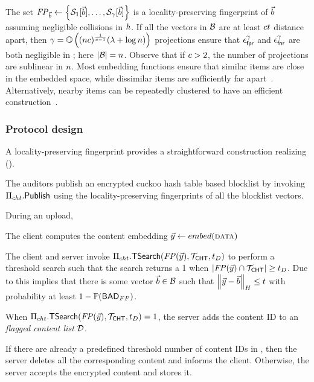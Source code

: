The set $\fingerprint{\blocklistVec} \assign \setDefn{\projBuckets[1][\blocklistVec], \dots, \projBuckets[\numProjections][\blocklistVec]}$ is a locality-preserving 
fingerprint of $\blocklistVec$ assuming negligible collisions in $\hashFn$. If all the vectors in $\blocklist$ are at least $c 
t$ distance apart, then $\gamma = \mathbb{O}\left((n 
c)^{\frac{1}{c - 1}} (\lambda + \log n)\right)$ projections ensure that 
$\epsilon_\mathsf{fpr}^\gamma$ and $\epsilon_\mathsf{fnr}^\gamma$ are both negligible in \secParam; here $\setSize{\blocklist} = \blocklistSize$. Observe that if $c > 2$, the number of projections are sublinear in 
$n$. Most embedding functions ensure that similar 
items are close in the embedded space, while dissimilar items are sufficiently far apart~\cite{kulshrestha2021identifying, mckeown2023hamming}. Alternatively, nearby items can be repeatedly 
clustered to have an efficient construction~\cite{chongchitmate2024approximate}.

\subsubsection{Protocol design}
%
A locality-preserving fingerprint provides a straightforward construction realizing \contentModFuncFuzzy (). 

\enumListStart
\item The auditors publish an encrypted cuckoo hash table based blocklist by invoking $\Pi_{cht}.\mathsf{Publish}$ using the locality-preserving fingerprints of all the blocklist vectors. 
\item During an upload, 
\enumListStart
\item The client computes the content embedding $\clientVec \assign \embed(\clientData)$
\item The client and server invoke $\chtACB.\thresholdSearchBlocklist(\fingerprint(\clientVec), \chtBlklistToken, \detectionThreshold)$ to perform a threshold search such that the search returns a 1 when 
$|\fingerprint(\clientVec) \cap \chtBlklistToken| \ge \detectionThreshold$. Due to  this implies that there is some vector $\blocklistVec \in \blocklist$ such that $\hammingDist{\clientVec}{\blocklistVec} \le \threshold$ with probability at least $1 - \mathbb{P}\mathopen{}\left({\mathsf{BAD}_{FP}}\right)\mathclose{}$. 
\item When $\chtACB.\thresholdSearchBlocklist(\fingerprint(\clientVec), \chtBlklistToken, \detectionThreshold) = 1$, the server adds the content ID to an \emph{flagged content list} $\mathcal{D}$. 
\item If there are already a predefined threshold \revealThreshold number of content IDs in \flagContentList, then the server deletes all the corresponding content and informs the client. Otherwise, the server accepts the encrypted content and stores it. 
\enumListEnd
\enumListEnd

